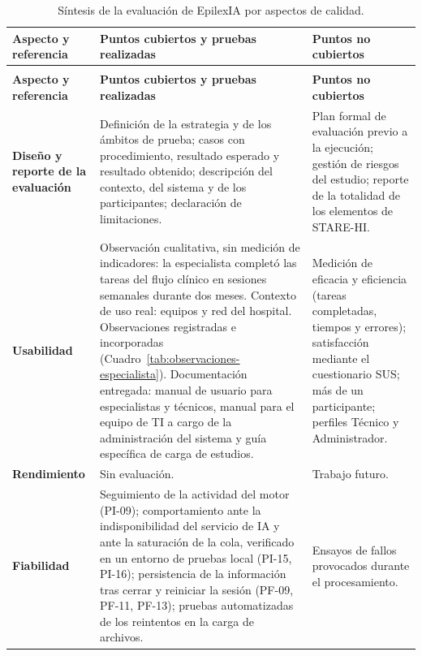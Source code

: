 \begingroup
\footnotesize
\setlength{\tabcolsep}{4pt}
\renewcommand{\arraystretch}{1.15}
\begin{longtable}{|>{\raggedright\arraybackslash}p{}|>{\raggedright\arraybackslash}p{}|>{\raggedright\arraybackslash}p{}|}
\caption{Síntesis de la evaluación de EpilexIA por aspectos de calidad.}
\label{tab:sintesis-aspectos}\\
\hline
\textbf{Aspecto y referencia} & \textbf{Puntos cubiertos y pruebas realizadas} & \textbf{Puntos no cubiertos} \\
\hline
\endfirsthead

\multicolumn{3}{c}{\textit{Continuación del Cuadro~\thetable}}\\
\hline
\textbf{Aspecto y referencia} & \textbf{Puntos cubiertos y pruebas realizadas} & \textbf{Puntos no cubiertos} \\
\hline
\endhead

\textbf{Diseño y reporte de la evaluación} \citep{Nykanen2011GEPHI,Talmon2009STAREHI} &
Definición de la estrategia y de los ámbitos de prueba; casos con procedimiento, resultado esperado y resultado obtenido; descripción del contexto, del sistema y de los participantes; declaración de limitaciones. &
Plan formal de evaluación previo a la ejecución; gestión de riesgos del estudio; reporte de la totalidad de los elementos de STARE-HI. \\
\hline

\textbf{Usabilidad} \citep{ISO9241-11:2018,Brooke1996SUS} &
Observación cualitativa, sin medición de indicadores: la especialista completó las tareas del flujo clínico en sesiones semanales durante dos meses. Contexto de uso real: equipos y red del hospital. Observaciones registradas e incorporadas (Cuadro~\ref{tab:observaciones-especialista}). Documentación entregada: manual de usuario para especialistas y técnicos, manual para el equipo de TI a cargo de la administración del sistema y guía específica de carga de estudios. &
Medición de eficacia y eficiencia (tareas completadas, tiempos y errores); satisfacción mediante el cuestionario SUS; más de un participante; perfiles Técnico y Administrador. \\
\hline

\textbf{Rendimiento} &
Sin evaluación. &
Trabajo futuro. \\
\hline

\textbf{Fiabilidad} &
Seguimiento de la actividad del motor (PI-09); comportamiento ante la indisponibilidad del servicio de IA y ante la saturación de la cola, verificado en un entorno de pruebas local (PI-15, PI-16); persistencia de la información tras cerrar y reiniciar la sesión (PF-09, PF-11, PF-13); pruebas automatizadas de los reintentos en la carga de archivos. &
Ensayos de fallos provocados durante el procesamiento. \\
\hline


\end{longtable}
